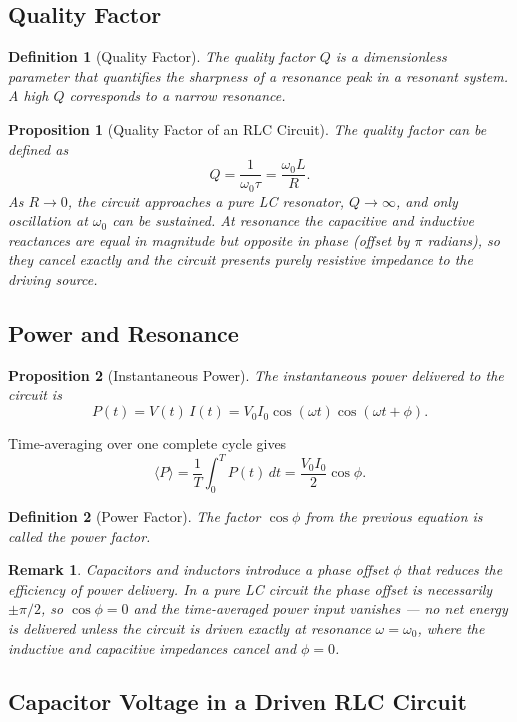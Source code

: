 \documentclass{article}
\newtheorem{definition}{Definition}
\newtheorem{remark}{Remark}
\newtheorem{proposition}{Proposition}
\begin{document}
\subsection{Quality Factor}
\begin{definition}[Quality Factor]
    The quality factor $Q$ is a dimensionless parameter that quantifies the sharpness of a resonance peak in a resonant system. A high $Q$ corresponds to a narrow resonance.
\end{definition}
\begin{proposition}[Quality Factor of an RLC Circuit]
    The quality factor can be defined as
    \[Q = \frac{1}{\omega_0\tau} = \frac{\omega_0 L}{R}.\]
    As $R \to 0$, the circuit approaches a pure LC resonator, $Q \to \infty$, and only oscillation at $\omega_0$ can be sustained. At resonance the capacitive and inductive reactances are equal in magnitude but opposite in phase (offset by $\pi$ radians), so they cancel exactly and the circuit presents purely resistive impedance to the driving source.
\end{proposition}

\subsection{Power and Resonance}
\begin{proposition}[Instantaneous Power]
    The instantaneous power delivered to the circuit is
    \[P(t) = V(t)\,I(t) = V_0 I_0\cos(\omega t)\cos(\omega t + \phi).\]
\end{proposition}
Time-averaging over one complete cycle gives
\[\langle P \rangle = \frac{1}{T}\int_0^T P(t)\,dt = \frac{V_0 I_0}{2}\cos\phi.\]
\begin{definition}[Power Factor]
    The factor $\cos\phi$ from the previous equation is called the power factor.
\end{definition}
\begin{remark}
    Capacitors and inductors introduce a phase offset $\phi$ that reduces the efficiency of power delivery. In a pure LC circuit the phase offset is necessarily $\pm\pi/2$, so $\cos\phi = 0$ and the time-averaged power input vanishes --- no net energy is delivered unless the circuit is driven exactly at resonance $\omega = \omega_0$, where the inductive and capacitive impedances cancel and $\phi = 0$.
\end{remark}

\subsection{Capacitor Voltage in a Driven RLC Circuit}
\end{document}
